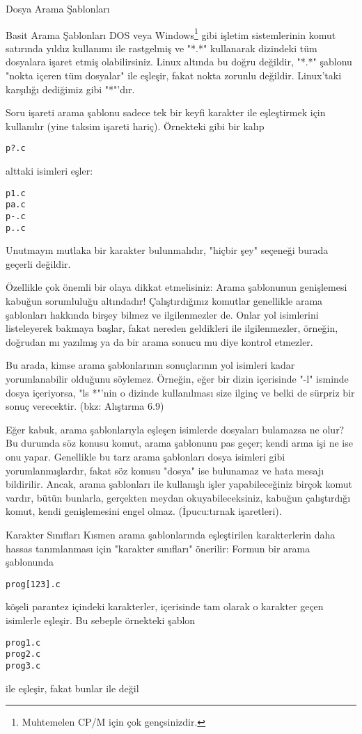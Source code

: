 \begin{section}{Dosya Arama Şablonları}
\begin{subsection}{Basit Arama Şablonları}
DOS veya Windows\footnote{Muhtemelen CP/M için çok gençsinizdir.} gibi işletim sistemlerinin komut satırında yıldız kullanımı ile rastgelmiş ve "*.*" kullanarak dizindeki tüm dosyalara işaret etmiş olabilirsiniz. Linux altında bu doğru değildir, "*.*" şablonu "nokta içeren tüm dosyalar" ile eşleşir, fakat nokta zorunlu değildir. Linux'taki karşılığı dediğimiz gibi "*"'dır. 

Soru işareti arama şablonu sadece tek bir keyfi karakter ile eşleştirmek için kullanılır (yine taksim işareti hariç). 
Örnekteki gibi bir kalıp
\begin{verbatim}
p?.c
\end{verbatim}
alttaki isimleri eşler:
\begin{verbatim}
p1.c
pa.c
p-.c
p..c
\end{verbatim}
Unutmayın mutlaka bir karakter bulunmalıdır, "hiçbir şey" seçeneği burada geçerli değildir.

Özellikle çok önemli bir olaya dikkat etmelisiniz: Arama şablonunun genişlemesi kabuğun sorumluluğu altındadır! Çalıştırdığınız komutlar genellikle arama şablonları hakkında birşey bilmez ve ilgilenmezler de. Onlar yol isimlerini listeleyerek bakmaya başlar, fakat nereden geldikleri ile ilgilenmezler, örneğin, doğrudan mı yazılmış ya da bir arama sonucu mu diye kontrol etmezler.

Bu arada, kimse arama şablonlarının sonuçlarının yol isimleri kadar yorumlanabilir olduğunu söylemez. Örneğin, eğer bir dizin içerisinde "-l" isminde dosya içeriyorsa,  "ls *"'nin o dizinde kullanılması size ilginç ve belki de sürpriz bir sonuç verecektir. (bkz: Alıştırma 6.9)

Eğer kabuk, arama şablonlarıyla eşleşen isimlerde dosyaları bulamazsa ne olur? Bu durumda söz konusu komut, arama şablonunu pas geçer; kendi arma işi ne ise onu yapar. Genellikle bu tarz arama şablonları dosya isimleri gibi yorumlanmışlardır, fakat söz konusu "dosya" ise bulunamaz ve hata mesajı bildirilir. Ancak, arama şablonları ile kullanışlı işler yapabileceğiniz birçok komut vardır, bütün bunlarla, gerçekten meydan okuyabileceksiniz, kabuğun çalıştırdığı komut, kendi genişlemesini engel olmaz. (İpucu:tırnak işaretleri).
\end{subsection}
\begin{subsection}{Karakter Sınıfları}
Kısmen arama şablonlarında eşleştirilen karakterlerin daha hassas tanımlanması için "karakter sınıfları" önerilir: Formun bir arama şablonunda
\begin{verbatim}
prog[123].c
\end{verbatim}
köşeli parantez içindeki karakterler, içerisinde tam olarak o karakter geçen isimlerle eşleşir. Bu sebeple örnekteki şablon
\begin{verbatim}
prog1.c
prog2.c
prog3.c
\end{verbatim}
ile eşleşir, fakat bunlar ile değil


\end{subsection}
\end{section}
